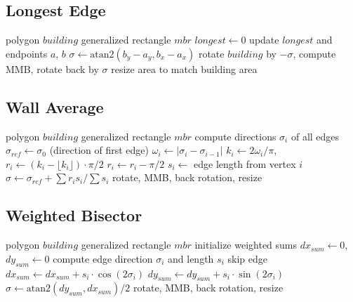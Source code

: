 \documentclass[11pt, a4paper]{article}
\begin{document}
\subsection{Longest Edge}
\begin{algorithm}[H] \caption{Longest Edge}
\begin{algorithmic}[1]
\Require polygon $building$
\Ensure generalized rectangle $mbr$
\State $longest \gets 0$
     update $longest$ and endpoints $a$, $b$ \EndIf
\EndFor
\State $\sigma \gets \text{atan2}(b_y - a_y, b_x - a_x)$
\State rotate $building$ by $-\sigma$, compute MMB, rotate back by $\sigma$
\State resize area to match building area
\end{algorithmic}
\end{algorithm}

\subsection{Wall Average}
\begin{algorithm}[H] \caption{Wall Average}
\begin{algorithmic}[1]
\Require polygon $building$
\Ensure generalized rectangle $mbr$
\State compute directions $\sigma_i$ of all edges
\State $\sigma_{ref} \gets \sigma_0$ (direction of first edge)
    \State $\omega_i \gets |\sigma_i - \sigma_{i-1}|$
    \State $k_i \gets 2\omega_i / \pi$, $r_i \gets (k_i - \lfloor k_i \rfloor) \cdot \pi/2$
     $r_i \gets r_i - \pi/2$ \EndIf
    \State $s_i \gets$ edge length from vertex $i$
\EndFor
\State $\sigma \gets \sigma_{ref} + \sum r_i s_i / \sum s_i$
\State rotate, MMB, back rotation, resize
\end{algorithmic}
\end{algorithm}

\subsection{Weighted Bisector}
\begin{algorithm}[H] \caption{Weighted Bisector}
\begin{algorithmic}[1]
\Require polygon $building$
\Ensure generalized rectangle $mbr$
\State initialize weighted sums $dx_{sum} \gets 0$, $dy_{sum} \gets 0$
    \State compute edge direction $\sigma_i$ and length $s_i$
     skip edge \EndIf
    \State $dx_{sum} \gets dx_{sum} + s_i \cdot \cos(2\sigma_i)$
    \State $dy_{sum} \gets dy_{sum} + s_i \cdot \sin(2\sigma_i)$
\EndFor
\State $\sigma \gets \text{atan2}(dy_{sum}, dx_{sum}) / 2$
\State rotate, MMB, back rotation, resize
\end{algorithmic}
\end{algorithm}
\end{document}
